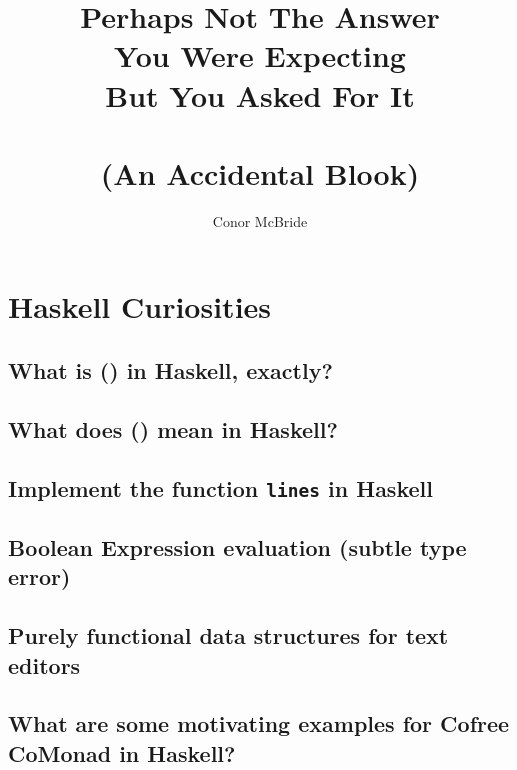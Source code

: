 \documentclass{book}%
\begin{document}
\title{Perhaps Not The Answer\\
       You Were Expecting\\
       But You Asked For It\\ ~\\
     (An Accidental Blook)}
\author{Conor McBride}
\maketitle

\tableofcontents

\chapter{Haskell Curiosities}

\section{What is () in Haskell, exactly?}


\section{What does () mean in Haskell?}


\section{Implement the function {\texttt{lines}} in Haskell}


\section{Boolean Expression evaluation (subtle type error)}


\section{Purely functional data structures for text editors}


\section{What are some motivating examples for Cofree CoMonad in Haskell?}

\end{document}
